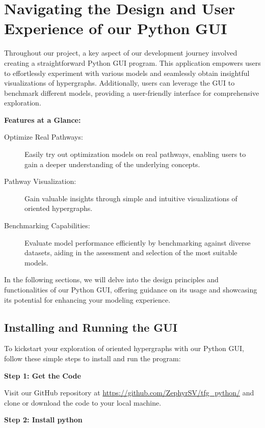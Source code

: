 \section{Navigating the Design and User Experience of our Python GUI}

Throughout our project, a key aspect of our development journey involved creating a straightforward Python GUI program. This application empowers users to effortlessly experiment with various models and seamlessly obtain insightful visualizations of hypergraphs. Additionally, users can leverage the GUI to benchmark different models, providing a user-friendly interface for comprehensive exploration.

\noindent\hrulefill

\textbf{Features at a Glance:}

\begin{description}
    \item[Optimize Real Pathways:] Easily try out optimization models on real pathways, enabling users to gain a deeper understanding of the underlying concepts.
    \item[Pathway Visualization:] Gain valuable insights through simple and intuitive visualizations of oriented hypergraphs.
    \item[Benchmarking Capabilities:] Evaluate model performance efficiently by benchmarking against diverse datasets, aiding in the assessment and selection of the most suitable models.
\end{description}

\noindent\hrulefill    

In the following sections, we will delve into the design principles and functionalities of our Python GUI, offering guidance on its usage and showcasing its potential for enhancing your modeling experience.

\subsection{  Installing and Running the GUI}

To kickstart your exploration of oriented hypergraphs with our Python GUI, follow these simple steps to install and run the program:

\textbf{Step 1: Get the Code}

Visit our GitHub repository at \url{https://github.com/ZephyrSV/tfg_python/} and clone or download the code to your local machine.

\textbf{Step 2: Install python}

